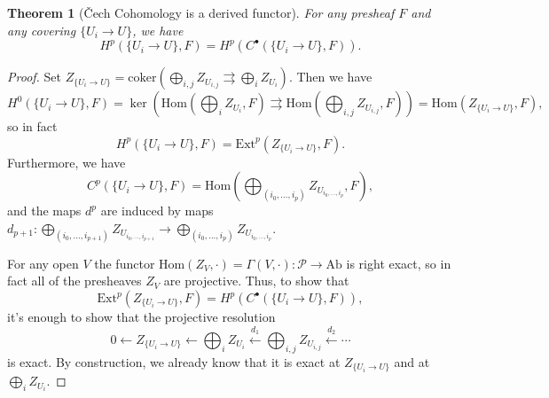\documentclass[letterpaper,11pt]{article}
\newtheorem{thm}{Theorem}
\theoremstyle{definition}
\theoremstyle{remark}
\begin{document}
\begin{thm}[\v{C}ech Cohomology is a derived functor]\label{cech} For any presheaf $F$ and any covering $\{U_i\rightarrow U\}$, we have
\[
H^p(\{U_i\rightarrow U\},F) = H^p(C^\bullet(\{U_i\rightarrow U\},F)).
\]
\end{thm}
\begin{proof} Set $Z_{\{U_i\rightarrow U\}} = \mbox{coker}(\bigoplus_{i,j} Z_{U_{i,j}}\rightrightarrows \bigoplus_i Z_{U_i})$. Then we have
\[
H^0(\{U_i\rightarrow U\},F) = \ker(\mbox{Hom}(\bigoplus_i Z_{U_i},F) \rightrightarrows \mbox{Hom}(\bigoplus_{i,j} Z_{U_{i,j}},F)) = \mbox{Hom}(Z_{\{U_i\rightarrow U\}},F),
\]
so in fact
\[
H^p(\{U_i\rightarrow U\},F) = \mbox{Ext}^p(Z_{\{U_i\rightarrow U\}},F).
\]
Furthermore, we have
\[
C^p(\{U_i\rightarrow U\}, F) = \mbox{Hom}(\bigoplus_{(i_0, ..., i_p)} Z_{U_{i_0, ..., i_p}}, F),
\]
and the maps $d^p$ are induced by maps $d_{p+1}: \bigoplus_{(i_0, ..., i_{p+1})} Z_{U_{i_0, ..., i_{p+1}}} \rightarrow \bigoplus_{(i_0, ..., i_p)} Z_{U_{i_0, ..., i_p}}$.

For any open $V$ the functor $\mbox{Hom}(Z_V,\cdot) = \Gamma(V,\cdot):\mathcal{P} \rightarrow \mbox{Ab}$ is right exact, so in fact all of the presheaves $Z_V$ are projective. Thus, to show that
\[
\mbox{Ext}^p(Z_{\{U_i\rightarrow U\}},F) = H^p(C^\bullet(\{U_i\rightarrow U\}, F)),
\]
it's enough to show that the projective resolution
\[
0 \leftarrow Z_{\{U_i\rightarrow U\}} \leftarrow \bigoplus_i Z_{U_i} \stackrel{d_1}{\longleftarrow} \bigoplus_{i,j} Z_{U_{i,j}} \stackrel{d_2}{\longleftarrow} \cdots
\]
is exact. By construction, we already know that it is exact at $Z_{\{U_i\rightarrow U\}}$ and at $\bigoplus_i Z_{U_i}$.


\end{proof}
\end{document}
